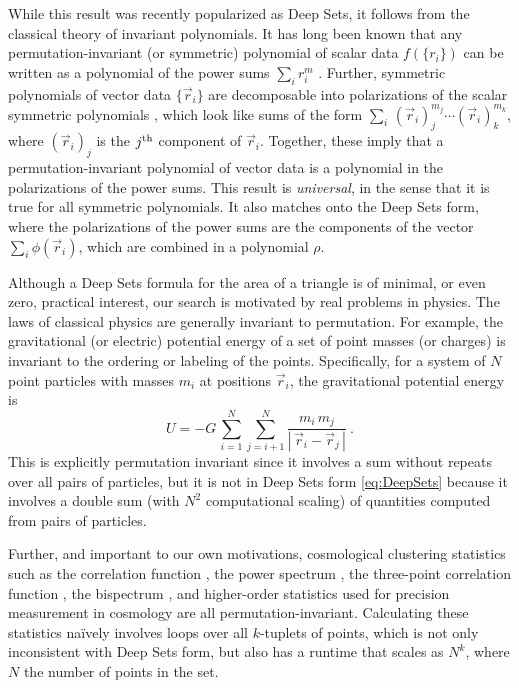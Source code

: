 \documentclass[10pt]{article}
\newcommand{\abs}[1]{|\,{#1}\,|}
\begin{document}
While this result was recently popularized as Deep Sets, it follows from the classical theory of invariant polynomials.
It has long been known that any permutation-invariant (or symmetric) polynomial of scalar data $f(\{r_i\})$ can be written as a polynomial of the power sums $\sum_i r_i^m$ \citep{Waring1782}.
Further, symmetric polynomials of vector data $\{ \vec{r}_i \}$ are decomposable into polarizations of the scalar symmetric polynomials \citep{Weyl1939}, which look like sums of the form $\sum_i \, (\vec{r}_{i})_{j}^{m_j} \cdots (\vec{r}_{i})_{k}^{m_k}$, where $(\vec{r}_i)_j$ is the $j^{\rm th}$ component of $\vec{r}_i$.
Together, these imply that a permutation-invariant polynomial of vector data is a polynomial in the polarizations of the power sums.
This result is \emph{universal}, in the sense that it is true for all symmetric polynomials.
It also matches onto the Deep Sets form, where the polarizations of the power sums are the components of the vector $\sum_i \phi(\vec{r}_i)$, which are combined in a polynomial $\rho$.

Although a Deep Sets formula for the area of a triangle is of minimal, or even zero, practical interest, our search is motivated by real problems in physics.
The laws of classical physics are generally invariant to permutation.
For example, the gravitational (or electric) potential energy of a set of point masses (or charges) is invariant to the ordering or labeling of the points. 
Specifically, for a system of $N$ point particles with masses $m_i$ at positions $\vec{r}_i$, the gravitational potential energy is
\begin{equation}
\label{eq:EnergyNaive}
    U = -G \, \sum_{i=1}^{N} \sum_{j=i+1}^{N} \frac{m_i \, m_j}{\abs{\vec{r}_i - \vec{r}_j}} ~.
\end{equation}
This is explicitly permutation invariant since it involves a sum without repeats over all pairs of particles, but it is not in Deep Sets form \eqref{eq:DeepSets} because it involves a double sum (with $N^2$ computational scaling) of quantities computed from pairs of particles.

Further, and important to our own motivations, cosmological clustering statistics such as 
the correlation function \citep{Peebles1973},
the power spectrum \citep{Peebles1973},
the three-point correlation function \citep{PeeblesGroth1975},
the bispectrum \citep{FrySeldner1982},
and higher-order statistics \citep{Peebles1980book}
used for precision measurement in cosmology \citep[e.g.,][]{Eisenstein+2005BAO,Planck18PNG,Planck18Inflation,Cabass+2022}
are all permutation-invariant.
Calculating these statistics na\"ively involves loops over all $k$-tuplets of points, which is not only inconsistent with Deep Sets form, but also has a runtime that scales as $N^k$, where $N$ the number of points in the set.
\end{document}
